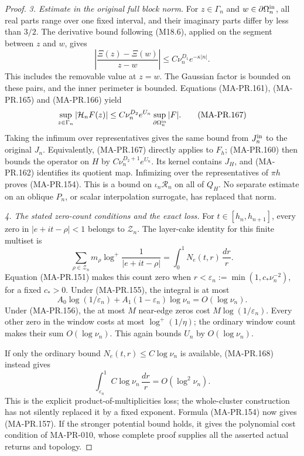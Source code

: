 \begin{proof}
\emph{3. Estimate in the original full block norm.}
For \(z\in\Gamma_n\) and
\(w\in\partial\Omega_n^{\rm in}\), all real parts
range over one fixed interval, and their imaginary
parts differ by less than \(3/2\).  The derivative
bound following (M18.6), applied on the segment
between \(z\) and \(w\), gives
\[
 \left|\frac{\Xi(z)-\Xi(w)}{z-w}\right|
             \le C\nu_n^{D_1}e^{-\kappa|n|}.
 \tag{MA-PR.166}
\]
This includes the removable value at \(z=w\).
The Gaussian factor is bounded on these pairs,
and the inner perimeter is bounded.  Equations
(MA-PR.161), (MA-PR.165) and (MA-PR.166) yield
\[
 \sup_{z\in\Gamma_n}|\mathcal H_nF(z)|
       \le C\nu_n^{D_2}e^{U_n}
                        \sup_{\partial\Omega_n^{\rm in}}|F|.
 \tag{MA-PR.167}
\]
Taking the infimum over representatives gives
the same bound from \(J_n^{\rm in}\) to the
original \(J_n\).  Equivalently, (MA-PR.167)
directly applies to \(F_h\); (MA-PR.160) then
bounds the operator on \(H\) by
\(C\nu_n^{D_2+1}e^{U_n}\).
Its kernel contains \(J_H\), and (MA-PR.162)
identifies its quotient map.  Infimizing over
the representatives of \(\pi h\) proves (MA-PR.154).
This is a bound on \(\iota_n\mathscr R_n\) on
all of \(Q_H\).  No separate estimate on an
oblique \(P_n\), or scalar interpolation surrogate,
has replaced that norm.

\emph{4. The stated zero-count conditions and the exact loss.}
For \(t\in[h_n,h_{n+1}]\), every zero in
\(|e+it-\rho|<1\) belongs to \(\mathcal Z_n\).
The layer-cake identity for this finite multiset is
\[
 \sum_{\rho\in\mathcal Z_n}m_\rho
          \log^+\frac1{|e+it-\rho|}
                =\int_0^1N_e(t,r)\,\frac{dr}{r}.
 \tag{MA-PR.168}
\]
Equation (MA-PR.151) makes this count zero when
\(r<\varepsilon_n:=\min(1,c_*\nu_n^{-2})\), for a fixed
\(c_*>0\).  Under (MA-PR.155), the integral is at most
\[
 A_0\log(1/\varepsilon_n)+A_1(1-\varepsilon_n)\log\nu_n
                                      =O(\log\nu_n).
 \tag{MA-PR.169}
\]
Under (MA-PR.156), the at most \(M\) near-edge zeros
cost \(M\log(1/\varepsilon_n)\).  Every other zero in the
window costs at most \(\log^+(1/\eta)\); the ordinary
window count makes their sum \(O(\log\nu_n)\).
This again bounds \(U_n\) by \(O(\log\nu_n)\).

If only the ordinary bound
\(N_e(t,r)\le C\log\nu_n\) is available, (MA-PR.168)
instead gives
\[
       \int_{\varepsilon_n}^1 C\log\nu_n\,\frac{dr}{r}
                              =O(\log^2\nu_n).
 \tag{MA-PR.170}
\]
This is the explicit product-of-multiplicities loss;
the whole-cluster construction has not silently
replaced it by a fixed exponent.  Formula (MA-PR.154)
now gives (MA-PR.157).  If the stronger potential
bound holds, it gives the polynomial cost condition
of MA-PR-010, whose complete proof supplies all
the asserted actual returns and topology.
\end{proof}

